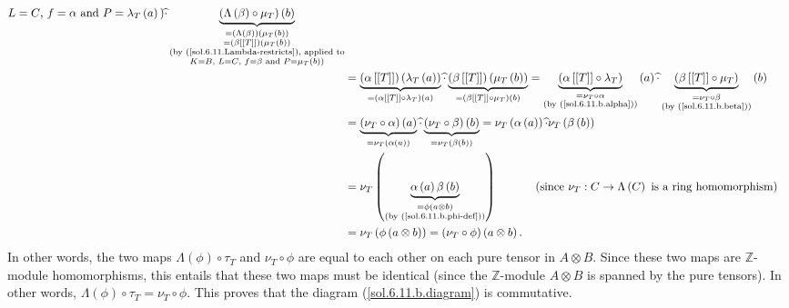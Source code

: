\documentclass[numbers=enddot,12pt,final,onecolumn,notitlepage]{scrartcl}%
\begin{document}
\begin{align*}
{{{}L=C\text{, }f=\alpha\text{ and }P=\lambda_{T}\left(  a\right)  \text{)}%
}}\widehat{\cdot}\underbrace{\left(  \Lambda\left(  \beta\right)  \circ\mu
_{T}\right)  \left(  b\right)  }_{\substack{=\left(  \Lambda\left(
\beta\right)  \right)  \left(  \mu_{T}\left(  b\right)  \right)  \\=\left(
\beta\left[  \left[  T\right]  \right]  \right)  \left(  \mu_{T}\left(
b\right)  \right)  \\\text{(by (\ref{sol.6.11.Lambda-restricts}), applied
to}\\K=B\text{, }L=C\text{, }f=\beta\text{ and }P=\mu_{T}\left(  b\right)
\text{)}}}\\
&  =\underbrace{\left(  \alpha\left[  \left[  T\right]  \right]  \right)
\left(  \lambda_{T}\left(  a\right)  \right)  }_{=\left(  \alpha\left[
\left[  T\right]  \right]  \circ\lambda_{T}\right)  \left(  a\right)
}\widehat{\cdot}\underbrace{\left(  \beta\left[  \left[  T\right]  \right]
\right)  \left(  \mu_{T}\left(  b\right)  \right)  }_{=\left(  \beta\left[
\left[  T\right]  \right]  \circ\mu_{T}\right)  \left(  b\right)
}=\underbrace{\left(  \alpha\left[  \left[  T\right]  \right]  \circ
\lambda_{T}\right)  }_{\substack{=\nu_{T}\circ\alpha\\\text{(by
(\ref{sol.6.11.b.alpha}))}}}\left(  a\right)  \widehat{\cdot}%
\underbrace{\left(  \beta\left[  \left[  T\right]  \right]  \circ\mu
_{T}\right)  }_{\substack{=\nu_{T}\circ\beta\\\text{(by (\ref{sol.6.11.b.beta}%
))}}}\left(  b\right) \\
&  =\underbrace{\left(  \nu_{T}\circ\alpha\right)  \left(  a\right)  }%
_{=\nu_{T}\left(  \alpha\left(  a\right)  \right)  }\widehat{\cdot
}\underbrace{\left(  \nu_{T}\circ\beta\right)  \left(  b\right)  }_{=\nu
_{T}\left(  \beta\left(  b\right)  \right)  }=\nu_{T}\left(  \alpha\left(
a\right)  \right)  \widehat{\cdot}\nu_{T}\left(  \beta\left(  b\right)
\right) \\
&  =\nu_{T}\left(  \underbrace{\alpha\left(  a\right)  \beta\left(  b\right)
}_{\substack{=\phi\left(  a\otimes b\right)  \\\text{(by
(\ref{sol.6.11.b.phi-def}))}}}\right)  \ \ \ \ \ \ \ \ \ \ \left(  \text{since
}\nu_{T}:C\rightarrow\Lambda\left(  C\right)  \text{ is a ring homomorphism}%
\right) \\
&  =\nu_{T}\left(  \phi\left(  a\otimes b\right)  \right)  =\left(  \nu
_{T}\circ\phi\right)  \left(  a\otimes b\right)  .
\end{align*}
In other words, the two maps $\Lambda\left(  \phi\right)  \circ\tau_{T}$ and
$\nu_{T}\circ\phi$ are equal to each other on each pure tensor in $A\otimes
B$. Since these two maps are $\mathbb{Z}$-module homomorphisms, this entails
that these two maps must be identical (since the $\mathbb{Z}$-module $A\otimes
B$ is spanned by the pure tensors). In other words, $\Lambda\left(
\phi\right)  \circ\tau_{T}=\nu_{T}\circ\phi$. This proves that the diagram
(\ref{sol.6.11.b.diagram}) is commutative.
\end{document}
